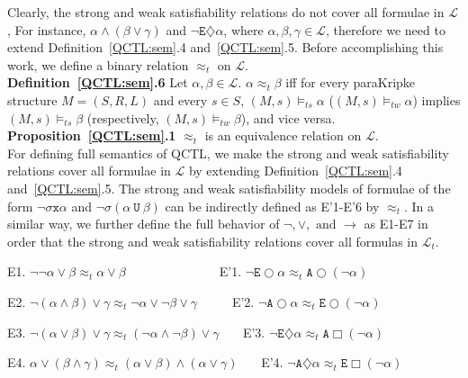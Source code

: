 \documentclass{entcs}
\begin{document}
Clearly, the strong and weak satisfiability relations do not cover
all formulae in $\mathcal{L}$, For instance,
$\alpha\wedge(\beta\vee\gamma)$ and $\neg\texttt{E}\diamondsuit
\alpha$, where $\alpha,\beta,\gamma\in\mathcal{L}$, therefore we
need to extend Definition~\ref{QCTL:sem}.4 and~\ref{QCTL:sem}.5.
Before accomplishing this work, we define a binary relation
$\approx_t$ on $\mathcal{L}$.\\

\noindent\textbf{Definition~\ref{QCTL:sem}.6} Let $\alpha,\beta\in
\mathcal{L}$. $\alpha \approx_t \beta$ iff for every paraKripke
structure $M=(S,R,L)$ and every $s\in S$,
$(M,s)\models_{ts}\alpha$ ($(M,s)\models_{tw}\alpha$) implies
$(M,s)\models_{ts}\beta$
(respectively, $(M,s)\models_{tw}\beta$), and vice versa.\\

\noindent\textbf{Proposition~\ref{QCTL:sem}.1} $\approx_t$ is an
equivalence
relation on $\mathcal{L}$. \\

For defining full semantics of QCTL, we make the strong and weak
satisfiability relations cover all formulae in $\mathcal{L}$ by
extending Definition~\ref{QCTL:sem}.4 and~\ref{QCTL:sem}.5. The
strong and weak satisfiability models of formulae of the form
$\neg\sigma\texttt{x}\alpha$ and $\neg\sigma(\alpha\ \texttt{U}\
\beta)$ can be indirectly defined as E'1-E'6 by $\approx_t$. In a
similar way, we further define the full behavior of
$\neg,\vee,\mbox{ and }\rightarrow$ as E1-E7 in order that the
strong and weak satisfiability relations cover all formulas in
$\mathcal{L}_t$.


E1. $\neg\neg \alpha\vee \beta \approx_t \alpha\vee \beta\qquad
\qquad\qquad\ \ \ \ \ $ E'1.
$\neg\texttt{E}\bigcirc\alpha\approx_t\texttt{A}\bigcirc(\neg
\alpha) $

E2. $\neg (\alpha\wedge \beta)\vee \gamma
\approx_t\neg \alpha\vee\neg \beta\vee \gamma \qquad\ \ $ E'2.
$\neg\texttt{A}\bigcirc \alpha\approx_t\texttt{E}\bigcirc (\neg
\alpha)$ %

E3. $\neg(\alpha\vee \beta)\vee \gamma\approx_t (\neg
\alpha\wedge\neg \beta)\vee \gamma\quad\ \ \ \ $E'3. $\neg
\texttt{E}\diamondsuit \alpha\approx_t\texttt{A}\Box (\neg \alpha)
$ %

E4. $\alpha\vee(\beta\wedge\gamma)\approx_t (\alpha\vee
\beta)\wedge (\alpha\vee \gamma)\quad\ \;$ E'4. $\neg
\texttt{A}\diamondsuit \alpha\approx_t\texttt{E}\Box(\neg \alpha)$
\end{document}
